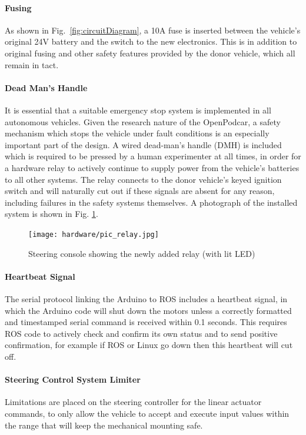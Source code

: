 \documentclass[a4paper]{article}
\begin{document}
	\paragraph{Fusing} As shown in Fig.~\ref{fig:circuitDiagram}, a 10A fuse is inserted between the vehicle's original 24V battery and the switch to the new electronics. This is in addition to original fusing and other safety features provided by the donor vehicle, which all remain in tact. 
	
	\paragraph{Dead Man's Handle} It is essential that a suitable emergency stop system is implemented in all autonomous vehicles. Given the research nature of the OpenPodcar, a safety mechanism which stops the vehicle under fault conditions is an especially important part of the design. A wired dead-man's handle (DMH) is included which is required to be pressed by a human experimenter at all times, in order for a hardware relay to actively continue to supply power from the vehicle’s batteries to all other systems. The relay connects to the donor vehicle's keyed ignition switch and will naturally cut out if these signals are absent for any reason, including failures in the safety systems themselves. A photograph of the installed system is shown in Fig. \ref{fig:relay}.
	
	\begin{figure}
		\centering
		\texttt{[image: hardware/pic\_relay.jpg]}
		\caption{Steering console showing the newly added relay (with lit LED)}
		\label{fig:relay}
	\end{figure}
	
	\paragraph{Heartbeat Signal} The serial protocol linking the Arduino to ROS includes a heartbeat signal, in which the Arduino code will shut down the motors unless a correctly formatted and timestamped serial command is received within 0.1 seconds. This requires ROS code to actively check and confirm its own status and to send positive confirmation, for example if ROS or Linux go down then this heartbeat will cut off.
	
	\paragraph{Steering Control System Limiter} Limitations are placed on the steering controller for the linear actuator commands, to only allow the vehicle to accept and execute input values within the range that will keep the mechanical mounting safe.
	
\end{document}
